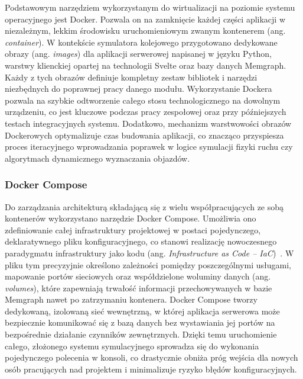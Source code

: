 \documentclass[twoside]{projektInzynierskiMS1z}
\begin{document}
Podstawowym narzędziem wykorzystanym do wirtualizacji na poziomie systemu operacyjnego
jest Docker. Pozwala on na zamknięcie każdej części aplikacji w niezależnym, lekkim
środowisku uruchomieniowym zwanym kontenerem (ang. \emph{container}). W kontekście
symulatora kolejowego przygotowano dedykowane obrazy (ang. \emph{images}) dla aplikacji
serwerowej napisanej w języku Python, warstwy klienckiej opartej na technologii Svelte
oraz bazy danych Memgraph. Każdy z tych obrazów definiuje kompletny zestaw bibliotek
i narzędzi niezbędnych do poprawnej pracy danego modułu. Wykorzystanie Dockera pozwala
na szybkie odtworzenie całego stosu technologicznego na dowolnym urządzeniu, co jest
kluczowe podczas pracy zespołowej oraz przy późniejszych testach integracyjnych systemu.
Dodatkowo, mechanizm warstwowości obrazów Dockerowych optymalizuje czas budowania
aplikacji, co znacząco przyspiesza proces iteracyjnego wprowadzania poprawek w logice
symulacji fizyki ruchu czy algorytmach dynamicznego wyznaczania objazdów.

\subsubsection{Docker Compose}

Do zarządzania architekturą składającą się z wielu współpracujących ze sobą kontenerów
wykorzystano narzędzie Docker Compose. Umożliwia ono zdefiniowanie całej infrastruktury
projektowej w postaci pojedynczego, deklaratywnego pliku konfiguracyjnego, co stanowi
realizację nowoczesnego paradygmatu infrastruktury jako kodu (ang. \emph{Infrastructure
as Code -- IaC})~\cite{infrastructureascode}. W pliku tym precyzyjnie określono
zależności pomiędzy poszczególnymi usługami, mapowanie portów sieciowych oraz
współdzielone woluminy danych (ang. \emph{volumes}), które zapewniają trwałość
informacji przechowywanych w bazie Memgraph nawet po zatrzymaniu kontenera. Docker
Compose tworzy dedykowaną, izolowaną sieć wewnętrzną, w której aplikacja serwerowa może
bezpiecznie komunikować się z bazą danych bez wystawiania jej portów na bezpośrednie
działanie czynników zewnętrznych. Dzięki temu uruchomienie całego, złożonego systemu
symulacyjnego sprowadza się do wykonania pojedynczego polecenia w konsoli, co
drastycznie obniża próg wejścia dla nowych osób pracujących nad projektem
i minimalizuje ryzyko błędów konfiguracyjnych.
\end{document}
